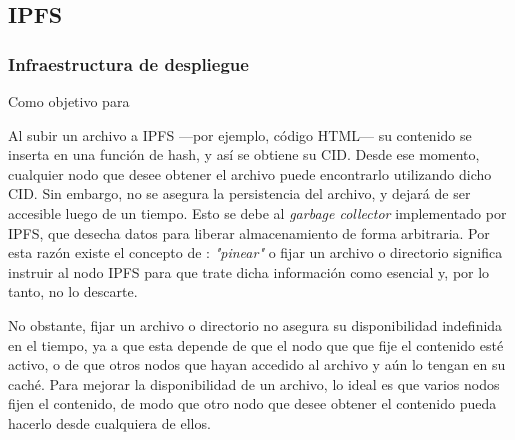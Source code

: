 \subsection{IPFS}

\subsubsection{Infraestructura de despliegue}



Como objetivo para 

Al subir un archivo a IPFS —por ejemplo, código HTML— su contenido se inserta en una función de hash, y así se obtiene su CID. Desde ese momento, cualquier nodo que desee obtener el archivo puede encontrarlo utilizando dicho CID. Sin embargo, no se asegura la persistencia del archivo, y dejará de ser accesible luego de un tiempo. Esto se debe al \textit{garbage collector} \cite{garbage-collector} implementado por IPFS, que desecha datos para liberar almacenamiento de forma arbitraria. Por esta razón existe el concepto de \cite{pinning}: \textit{"pinear"} o fijar un archivo o directorio significa instruir al nodo IPFS para que trate dicha información como esencial y, por lo tanto, no lo descarte. 

No obstante, fijar un archivo o directorio no asegura su disponibilidad indefinida en el tiempo, ya a que esta depende de que el nodo que que fije el contenido esté activo, o de que otros nodos que hayan accedido al archivo y aún lo tengan en su caché. Para mejorar la disponibilidad de un archivo, lo ideal es que varios nodos fijen el contenido, de modo que otro nodo que desee obtener el contenido pueda hacerlo desde cualquiera de ellos.


